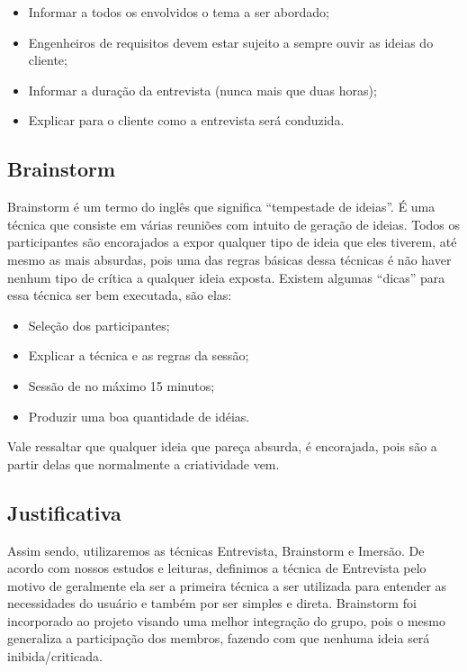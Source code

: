   \begin{itemize}
    \item Informar a todos os envolvidos o tema a ser abordado;
    \item Engenheiros de requisitos devem estar sujeito a sempre ouvir as ideias do cliente;
    \item Informar a duração da entrevista (nunca mais que duas horas);
    \item Explicar para o cliente como a entrevista será conduzida.
  \end{itemize}

\subsection{Brainstorm}

  Brainstorm é um termo do inglês que significa “tempestade de ideias”. É uma técnica que consiste em várias reuniões com intuito
  de geração de ideias. Todos os participantes são encorajados a expor qualquer tipo de ideia que eles tiverem, até mesmo as mais
  absurdas, pois uma das regras básicas dessa técnicas é não haver nenhum tipo de crítica a qualquer ideia exposta. Existem algumas
  “dicas” para essa técnica ser bem executada, são elas:

  \begin{itemize}
    \item Seleção dos participantes;
    \item Explicar a técnica e as regras da sessão;
    \item Sessão de no máximo 15 minutos;
    \item Produzir uma boa quantidade de idéias.
  \end{itemize}

  Vale ressaltar que qualquer ideia que pareça absurda, é encorajada, pois são a partir delas que normalmente a criatividade vem.

\subsection{Justificativa}

  Assim sendo, utilizaremos as técnicas Entrevista, Brainstorm e Imersão. De acordo com nossos estudos e leituras, definimos a
  técnica de Entrevista pelo motivo de geralmente ela ser a primeira técnica a ser utilizada para entender as necessidades do
  usuário e também por ser simples e direta. Brainstorm foi incorporado ao projeto visando uma melhor integração do grupo, pois
  o mesmo generaliza a participação dos membros, fazendo com que nenhuma ideia será inibida/criticada.



